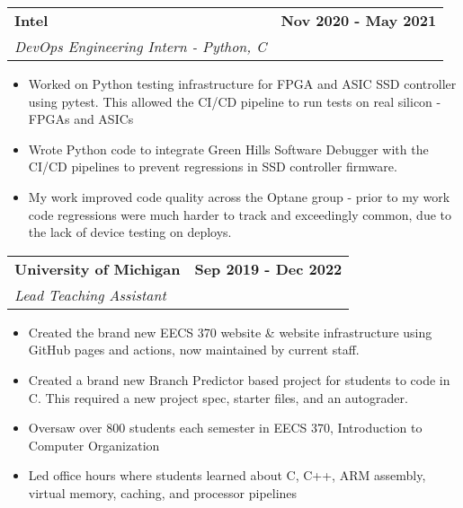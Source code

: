 \documentclass[10pt]{extreport}
\makeatletter
\newcommand{\resumeSubheading}[4]{
  \vspace{-1pt}
    \begin{tabular*}{1.0\textwidth}{l@{\extracolsep{\fill}}r}
      \textbf{#1} & \textbf{#2}  \vspace{1mm} \\
      {#3} & \textbf{#4} \\
    \end{tabular*}\vspace{-3pt}
}
\makeatother
\begin{document}
    \resumeSubheading{Intel}{Nov 2020 - May 2021}
    {\textit{DevOps Engineering Intern - Python, C}}{}
    \vspace{-2mm}
    \begin{itemize}
    \item[\textperiodcentered] Worked on Python testing infrastructure for FPGA and ASIC SSD controller using pytest. This allowed the CI/CD pipeline to run tests on real silicon - FPGAs and ASICs
            \vspace{-2mm}

    \item[\textperiodcentered] Wrote Python code to integrate Green Hills Software Debugger with the CI/CD pipelines to prevent regressions in SSD controller firmware. 
            \vspace{-2mm}

    \item[\textperiodcentered] My work 
 improved code quality across the Optane group - prior to my work code regressions were much harder to track and exceedingly common, due to the lack of device testing on deploys.
    \end{itemize}
    
    \resumeSubheading{University of Michigan}{Sep 2019 - Dec 2022}
    {\textit{Lead Teaching Assistant}}{}
        \vspace{-2mm}
    \begin{itemize}
    \item[\textperiodcentered] Created the brand new EECS 370 website \& website infrastructure using GitHub pages and actions, now maintained by current staff.
        \vspace{-2mm}
    \item[\textperiodcentered] Created a brand new Branch Predictor based project for students to code in C. This required a new project spec, starter files, and an autograder.
        \vspace{-2mm}
    \item[\textperiodcentered] Oversaw over 800 students each semester in EECS 370, Introduction to Computer Organization
        \vspace{-2mm}
    \item[\textperiodcentered] Led office hours where students learned
    about C, C++, ARM assembly, virtual memory, caching, and processor pipelines
    \end{itemize}
\end{document}
